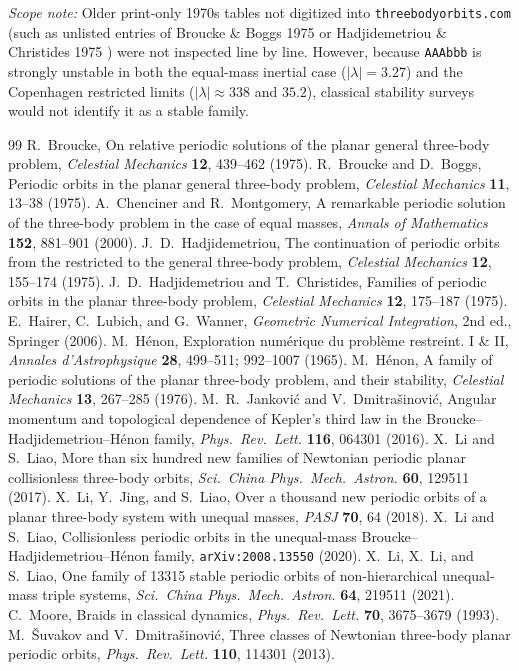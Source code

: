 \documentclass[11pt,a4paper]{article}
\begin{document}
\emph{Scope note:} Older print-only 1970s tables not digitized into \texttt{threebodyorbits.com} (such as unlisted entries of Broucke \& Boggs 1975 or Hadjidemetriou \& Christides 1975 \cite{HadjidemetriouChristides1975}) were not inspected line by line.
However, because \texttt{AAAbbb} is strongly unstable in both the equal-mass inertial case ($|\lambda| = 3.27$) and the Copenhagen restricted limits ($|\lambda| \approx 338$ and $35.2$), classical stability surveys would not identify it as a stable family.

\begin{thebibliography}{99}
 R.~Broucke, On relative periodic solutions of the planar general three-body problem, \emph{Celestial Mechanics} \textbf{12}, 439--462 (1975).
 R.~Broucke and D.~Boggs, Periodic orbits in the planar general three-body problem, \emph{Celestial Mechanics} \textbf{11}, 13--38 (1975).
 A.~Chenciner and R.~Montgomery, A remarkable periodic solution of the three-body problem in the case of equal masses, \emph{Annals of Mathematics} \textbf{152}, 881--901 (2000).
 J.~D.~Hadjidemetriou, The continuation of periodic orbits from the restricted to the general three-body problem, \emph{Celestial Mechanics} \textbf{12}, 155--174 (1975).
 J.~D.~Hadjidemetriou and T.~Christides, Families of periodic orbits in the planar three-body problem, \emph{Celestial Mechanics} \textbf{12}, 175--187 (1975).
 E.~Hairer, C.~Lubich, and G.~Wanner, \emph{Geometric Numerical Integration}, 2nd ed., Springer (2006).
 M.~H\'enon, Exploration num\'erique du probl\`eme restreint. I \& II, \emph{Annales d'Astrophysique} \textbf{28}, 499--511; 992--1007 (1965).
 M.~H\'enon, A family of periodic solutions of the planar three-body problem, and their stability, \emph{Celestial Mechanics} \textbf{13}, 267--285 (1976).
 M.~R.~Jankovi\'c and V.~Dmitra\v{s}inovi\'c, Angular momentum and topological dependence of Kepler's third law in the Broucke--Hadjidemetriou--H\'enon family, \emph{Phys.\ Rev.\ Lett.} \textbf{116}, 064301 (2016).
 X.~Li and S.~Liao, More than six hundred new families of Newtonian periodic planar collisionless three-body orbits, \emph{Sci.\ China Phys.\ Mech.\ Astron.} \textbf{60}, 129511 (2017).
 X.~Li, Y.~Jing, and S.~Liao, Over a thousand new periodic orbits of a planar three-body system with unequal masses, \emph{PASJ} \textbf{70}, 64 (2018).
 X.~Li and S.~Liao, Collisionless periodic orbits in the unequal-mass Broucke--Hadjidemetriou--H\'enon family, \texttt{arXiv:2008.13550} (2020).
 X.~Li, X.~Li, and S.~Liao, One family of 13315 stable periodic orbits of non-hierarchical unequal-mass triple systems, \emph{Sci.\ China Phys.\ Mech.\ Astron.} \textbf{64}, 219511 (2021).
 C.~Moore, Braids in classical dynamics, \emph{Phys.\ Rev.\ Lett.} \textbf{70}, 3675--3679 (1993).
 M.~\v{S}uvakov and V.~Dmitra\v{s}inovi\'c, Three classes of Newtonian three-body planar periodic orbits, \emph{Phys.\ Rev.\ Lett.} \textbf{110}, 114301 (2013).
\end{thebibliography}
\end{document}
